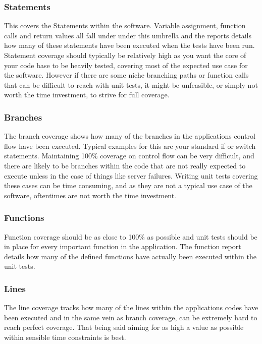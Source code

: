 \subsubsection{Statements}
This covers the Statements within the software. Variable assignment, function calls and return values all fall under under this umbrella and the reports details how many of these statements have been executed when the tests have been run. Statement coverage should typically be relatively high as you want the core of your code base to be heavily tested, covering most of the expected use case for the software. However if there are some niche branching paths or function calls that can be difficult to reach with unit tests, it might be unfeasible, or simply not worth the time investment, to strive for full coverage.
\subsubsection{Branches}
The branch coverage shows how many of the branches in the applications control flow have been executed. Typical examples for this are your standard if or switch statements. Maintaining 100\% coverage on control flow can be very difficult, and there are likely to be branches within the code that are not really expected to execute unless in the case of things like server failures. Writing unit tests covering these cases can be time consuming, and as they are not a typical use case of the software, oftentimes are not worth the time investment.
\subsubsection{Functions}
Function coverage should be as close to 100\% as possible and unit tests should be in place for every important function in the application. The function report details how many of the defined functions have actually been executed within the unit tests.
\subsubsection{Lines}
The line coverage tracks how many of the lines within the applications codes have been executed and in the same vein as branch coverage, can be extremely hard to reach perfect coverage. That being said aiming for as high a value as possible within sensible time constraints is best.
